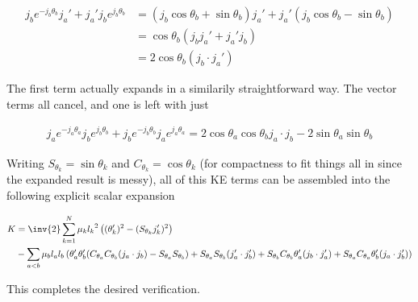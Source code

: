 \begin{align*}
j_b e^{-j_b \theta_b} j_a' + j_a' j_b e^{j_b \theta_b} 
&=
(j_b \cos\theta_b + \sin\theta_b) j_a' + j_a' (j_b \cos\theta_b - \sin\theta_b) \\
&=
\cos\theta_b (j_b j_a' + j_a' j_b ) \\
&=
2 \cos\theta_b (j_b \cdot j_a')
\end{align*}

The first term actually expands in a similarily straightforward way.  The vector terms all cancel, and one is left with just

\begin{align*}
j_a e^{-j_a \theta_a} j_b e^{j_b\theta_b} + j_b e^{-j_b \theta_b} j_a e^{j_a\theta_a} 
= 
2 \cos\theta_a\cos\theta_b j_a \cdot j_b - 2 \sin\theta_a \sin\theta_b 
\end{align*}

Writing $S_{\theta_k} = \sin\theta_k$ and $C_{\theta_k} = \cos\theta_k$ (for compactness to fit things all in since the expanded result is messy), all of this KE terms can be assembled into the following explicit scalar expansion

\begin{align*}
K &=
\inv{2}
\sum_{k=1}^N
\mu_k
{l_k}^2
\left( (\theta_k')^2 - (S_{\theta_k} j_k')^2 \right) \\
&-
\sum_{a<b}
\mu_b
l_a l_b
\left(
\theta_a' \theta_b' (C_{\theta_a}C_{\theta_b} (j_a \cdot j_b) - S_{\theta_a} S_{\theta_b} )
+S_{\theta_a} S_{\theta_b} (j_a' \cdot j_b')
+S_{\theta_b} C_{\theta_b} \theta_a' (j_b \cdot j_a')
+S_{\theta_a} C_{\theta_a} \theta_b' (j_a \cdot j_b')
\right)
\end{align*}

This completes the desired verification.

\EndNoBibArticle
